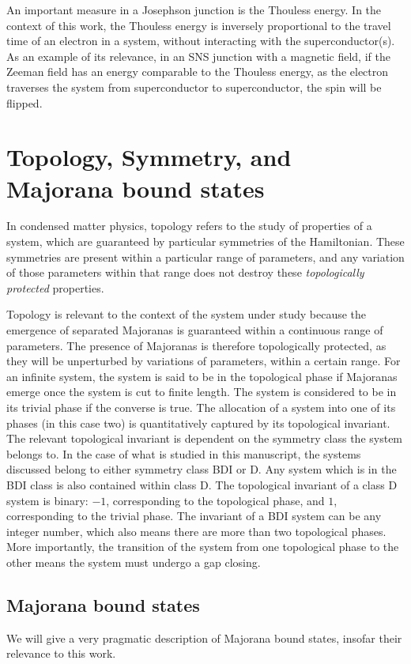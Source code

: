         An important measure in a Josephson junction is the Thouless energy.
        In the context of this work, the Thouless energy is inversely proportional to the travel time of an electron in a system, without interacting with the superconductor(s).
        As an example of its relevance, in an SNS junction with a magnetic field, if the Zeeman field has an energy comparable to the Thouless energy, as the electron traverses the system from superconductor to superconductor, the spin will be flipped.

    
\section{Topology, Symmetry, and Majorana bound states}
    In condensed matter physics, topology refers to the study of properties of a system, which are guaranteed by particular symmetries of the Hamiltonian.
    These symmetries are present within a particular range of parameters, and any variation of those parameters within that range does not destroy these \emph{topologically protected} properties.
    
    Topology is relevant to the context of the system under study because the emergence of separated Majoranas is guaranteed within a continuous range of parameters.
    The presence of Majoranas is therefore topologically protected, as they will be unperturbed by variations of parameters, within a certain range.
    For an infinite system, the system is said to be in the topological phase if Majoranas emerge once the system is cut to finite length.
    The system is considered to be in its trivial phase if the converse is true.
    The allocation of a system into one of its phases (in this case two) is quantitatively captured by its topological invariant.
    The relevant topological invariant is dependent on the symmetry class the system belongs to.
    In the case of what is studied in this manuscript, the systems discussed belong to either symmetry class BDI or D.
    Any system which is in the BDI class is also contained within class D.
    The topological invariant of a class D system is binary: $-1$, corresponding to the topological phase, and $1$, corresponding to the trivial phase.
    The invariant of a BDI system can be any integer number, which also means there are more than two topological phases.
    More importantly, the transition of the system from one topological phase to the other means the system must undergo a gap closing.


    \subsection{Majorana bound states}
        We will give a very pragmatic description of Majorana bound states, insofar their relevance to this work.

